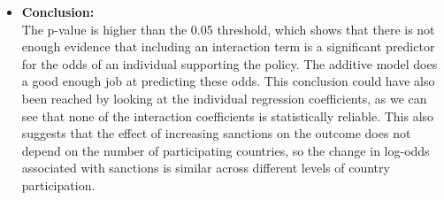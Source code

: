\documentclass[12pt,letterpaper]{article}
\begin{document}
\begin{enumerate}
\begin{itemize}
\begin{verbatim}
					Model 1: choice ~ countries + sanctions
					Model 2: choice ~ countries * sanctions
					Resid. Df Resid. Dev Df Deviance Pr(>Chi)
					1      8494      11568                     
					2      8488      11562  6   6.2928   0.3912
				\end{verbatim}
			\item \textbf{Conclusion: }\\[0.25cm]
			The p-value is higher than the 0.05 threshold, which shows that there is not enough evidence that including an interaction term is a significant predictor for the odds of an individual supporting the policy. The additive model does a good enough job at predicting these odds. This conclusion could have also been reached by looking at the individual regression coefficients, as we can see that none of the interaction coefficients is statistically reliable. This also suggests that the effect of increasing sanctions on the outcome does not depend on the number of participating countries, so the change in log-odds associated with sanctions is similar across different levels of country participation.
		\end{itemize}
	\end{enumerate}
\end{document}
